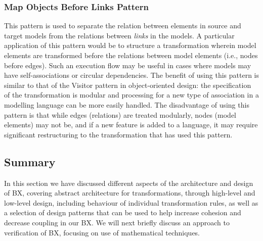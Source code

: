 \subsubsection{Map Objects Before Links Pattern}
This pattern is used to separate the relation between elements in source and target models from the relations between \textit{links} in the models. A particular application of this pattern would be to structure a transformation wherein model elements are transformed before the relations between model elements (i.e., nodes before edges). Such an execution flow may be useful in cases where models may have self-associations or circular dependencies. The benefit of using this pattern is similar to that of the Visitor pattern \cite{Gof1995} in object-oriented design: the specification of the transformation is modular and processing for a new type of association in a modelling language can be more easily handled. The disadvantage of using this pattern is that while edges (relations) are treated modularly, nodes (model elements) may not be, and if a new feature is added to a language, it may require significant restructuring to the transformation that has used this pattern.

\subsection{Summary}
In this section we have discussed different aspects of the architecture and design of BX, covering abstract architecture for transformations, through high-level and low-level design, including behaviour of individual transformation rules, as well as a selection of design patterns that can be used to help increase cohesion and decrease coupling in our BX. We will next briefly discuss an approach to verification of BX, focusing on use of mathematical techniques.